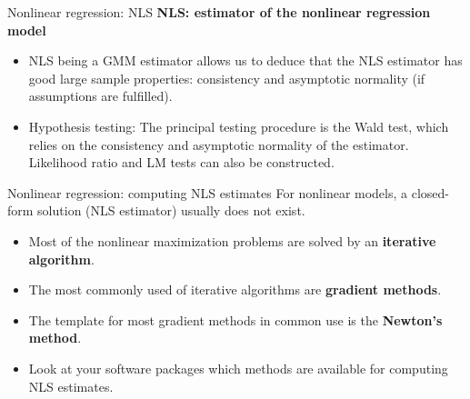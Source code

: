 \documentclass{beamer}
\begin{document}
\begin{frame}{Nonlinear regression: NLS}
\textbf{NLS: estimator of the nonlinear regression model}\\
\bigskip
\begin{itemize}
\item NLS being a GMM estimator allows us to deduce that the NLS estimator has good large sample properties: consistency and asymptotic normality (if assumptions are fulfilled).
\medskip
\item Hypothesis testing: The principal testing procedure is the Wald test, which relies on the consistency and asymptotic normality of the estimator. Likelihood ratio and LM tests can also be constructed.
\end{itemize}
\end{frame}
\begin{frame}{Nonlinear regression: computing NLS estimates}
For nonlinear models, a closed-form solution (NLS estimator) usually does not exist.\\
\medskip
\begin{itemize}
\item Most of the nonlinear maximization problems are solved by an \textbf{iterative algorithm}.
\item The most commonly used of iterative algorithms are \textbf{gradient methods}.
\item The template for most gradient methods in common use is the \textbf{Newton's method}.
\item Look at your software packages which methods are available for computing NLS estimates.
\end{itemize}
\end{frame}
\end{document}

